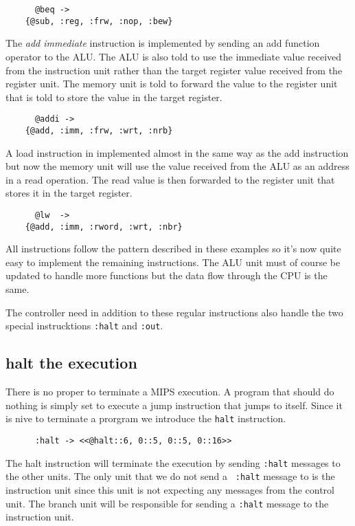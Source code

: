 \documentclass[a4paper,11pt]{article}
\begin{document}
\begin{verbatim}        
      @beq ->
	{@sub, :reg, :frw, :nop, :bew}
\end{verbatim}

The {\em add immediate} instruction is implemented by sending an add
function operator to the ALU. The ALU is also told to use the
immediate value received from the instruction unit rather than the
target register value received from the register unit. The memory unit
is told to forward the value to the register unit that is told to
store the value in the target register.

\begin{verbatim}
      @addi ->
	{@add, :imm, :frw, :wrt, :nrb}
\end{verbatim}

A load instruction in implemented almost in the same way as the add
instruction but now the memory unit will use the value received from
the ALU as an address in a read operation. The read value is then
forwarded to the register unit that stores it in the target register.

\begin{verbatim}
      @lw  ->
	{@add, :imm, :rword, :wrt, :nbr}	
\end{verbatim}

All instructions follow the pattern described in these examples so it's
now quite easy to implement the remaining instructions. The ALU unit
must of course be updated to handle more functions but the data flow
through the CPU is the same.

The controller need in addition to these regular instructions also
handle the two special instrucktions {\tt :halt} and {\tt :out}. 

\subsection{halt the execution}

There is no proper to terminate a MIPS execution. A program that
should do nothing is simply set to execute a jump instruction that
jumps to itself. Since it is nive to terminate a prorgram we introduce
the {\tt halt} instruction.

\begin{verbatim}
      :halt -> <<@halt::6, 0::5, 0::5, 0::16>>
\end{verbatim}

The halt instruction will terminate the execution by sending {\tt :halt}
messages to the other units. The only unit that we do not send a {\tt
  :halt} message to is the instruction unit since this unit is not
expecting any messages from the control unit. The branch unit will be
responsible for sending a {\tt :halt} message to the instruction unit.
\end{document}

